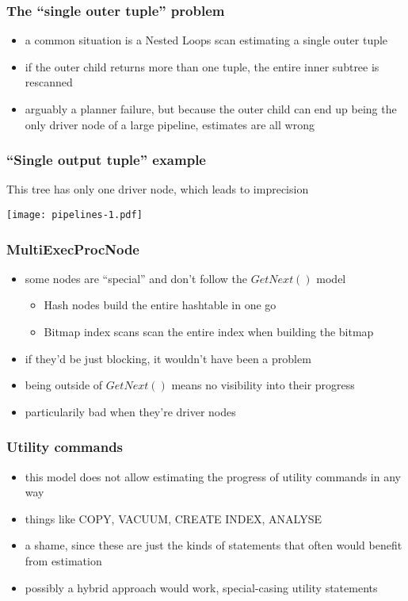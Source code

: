 \documentclass{beamer}
\begin{document}
\begin{frame}
  \frametitle{The ``single outer tuple'' problem}

  \begin{itemize}
  \item a common situation is a Nested Loops scan estimating a single outer
    tuple
  \item if the outer child returns more than one tuple, the entire inner
    subtree is rescanned
  \item arguably a planner failure, but because the outer child can end up
    being the only driver node of a large pipeline, estimates are all wrong
  \end{itemize}
\end{frame}

\begin{frame}
  \frametitle{``Single output tuple'' example}

  This tree has only one driver node, which leads to imprecision
  \begin{center}
    \texttt{[image: pipelines-1.pdf]}
  \end{center}
\end{frame}

\begin{frame}
  \frametitle{MultiExecProcNode}

  \begin{itemize}
  \item some nodes are ``special'' and don't follow the $GetNext()$ model
    \begin{itemize}
    \item Hash nodes build the entire hashtable in one go
    \item Bitmap index scans scan the entire index when building the bitmap
    \end{itemize}
  \item if they'd be just blocking, it wouldn't have been a problem
  \item being outside of $GetNext()$ means no visibility into their progress
  \item particularily bad when they're driver nodes
  \end{itemize}
\end{frame}

\begin{frame}
  \frametitle{Utility commands}

  \begin{itemize}
  \item this model does not allow estimating the progress of utility commands
    in any way
  \item things like COPY, VACUUM, CREATE INDEX, ANALYSE
  \item a shame, since these are just the kinds of statements that often would
    benefit from estimation
  \item possibly a hybrid approach would work, special-casing utility
    statements
  \end{itemize}
\end{frame}
\end{document}
